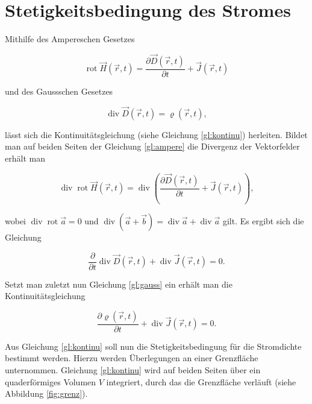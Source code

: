 \section{Stetigkeitsbedingung des Stromes}
Mithilfe des Ampereschen Gesetzes

\begin{equation}
\label{gl:ampere}
\operatorname{rot} \vec{H}(\vec{r},t) = \frac{\partial\vec{D}(\vec{r},t)}{\partial t}
+ \vec{J}(\vec{r},t)
\end{equation} 

und des Gaussschen Gesetzes

\begin{equation}
\label{gl:gauss}
\operatorname{div} \vec{D}(\vec{r},t) = \varrho (\vec{r},t),
\end{equation}

lässt sich die Kontinuitätsgleichung (siehe Gleichung \ref{gl:kontinu}) herleiten.
Bildet man auf beiden Seiten der Gleichung \ref{gl:ampere} die Divergenz der Vektorfelder erhält man

\begin{equation*}
\operatorname{div} \operatorname{rot} \vec{H}(\vec{r},t) = \operatorname{div} \left( \frac{\partial\vec{D}(\vec{r},t)}{\partial t} + \vec{J}(\vec{r},t) \right),
\end{equation*} 

wobei $\operatorname{div} \operatorname{rot} \vec{a} = 0$ und $\operatorname{div} (\vec{a}+\vec{b}) = \operatorname{div} \vec{a} + \operatorname{div} \vec{a}$ gilt. Es ergibt sich die Gleichung

\begin{equation*}
\frac{\partial}{\partial t}\operatorname{div}\vec{D}(\vec{r},t) + \operatorname{div}\vec{J}(\vec{r},t) = 0.
\end{equation*}

Setzt man zuletzt nun Gleichung \ref{gl:gauss} ein erhält man die Kontinuitätsgleichung

\begin{equation}
\label{gl:kontinu}
\frac{\partial \varrho (\vec{r},t)}{\partial t} + \operatorname{div}\vec{J}(\vec{r},t) = 0.
\end{equation}

Aus Gleichung \ref{gl:kontinu} soll nun die Stetigkeitsbedingung für die Stromdichte bestimmt werden. Hierzu werden Überlegungen an einer Grenzfläche unternommen. Gleichung \ref{gl:kontinu} wird auf beiden Seiten über ein quaderförmiges  Volumen $V$ integriert, durch das die Grenzfläche verläuft (siehe Abbildung \ref{fig:grenz}).

